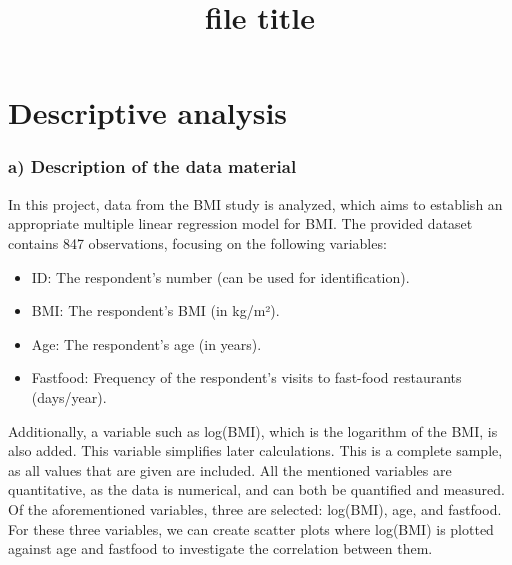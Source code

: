 \documentclass{rapport}
\title{file title} %
\begin{document}
\onehalfspacing


\subject{Subject} %


        
\buildmargins %
\buildcover %
\toc %

\section{Descriptive analysis}
\subsubsection*{\textbf{a)} Description of the data material}
\noindent
In this project, data from the BMI study is analyzed, which aims to establish an appropriate multiple linear regression model for BMI. The provided dataset contains 847 observations, focusing on the following variables:

\begin{itemize}
    \item ID: The respondent's number (can be used for identification).
    \item BMI: The respondent's BMI (in kg/m²).
    \item Age: The respondent's age (in years).
    \item Fastfood: Frequency of the respondent's visits to fast-food restaurants (days/year).
\end{itemize}

\noindent
Additionally, a variable such as log(BMI), which is the logarithm of the BMI, is also added. This variable simplifies later calculations.
\noindent
This is a complete sample, as all values that are given are included. All the mentioned variables are quantitative, as the data is numerical, and can both be quantified and measured. Of the aforementioned variables, three are selected: log(BMI), age, and fastfood.
\noindent
For these three variables, we can create scatter plots where log(BMI) is plotted against age and fastfood to investigate the correlation between them.
\end{document}
